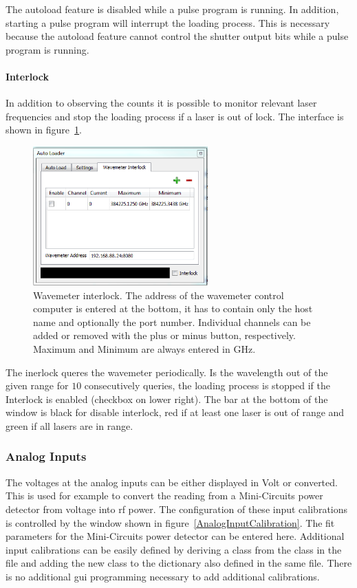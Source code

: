 \documentclass[11pt]{scrartcl}
\begin{document}
The autoload feature is disabled while a pulse program is running. In addition, starting a pulse program will interrupt the loading process. This is necessary because the autoload feature cannot control the shutter output bits while a pulse program is running.

\paragraph{Interlock}
In addition to observing the counts it is possible to monitor relevant laser frequencies and stop the loading process if a laser is out of lock. The interface is shown in figure~\ref{WavemeterInterlock}.
\begin{figure}
\centering
\includegraphics[width=0.6\textwidth]{WavemeterInterlock}
\caption{\label{WavemeterInterlock} Wavemeter interlock. The address of the wavemeter control computer is entered at the bottom, it has to contain only the host name and optionally the port number. Individual channels can be added or removed with the plus or minus button, respectively. Maximum and Minimum are always entered in GHz.}
\end{figure}

The inerlock queres the wavemeter periodically. Is the wavelength out of the given range for $10$ consecutively queries, the loading process is stopped if the Interlock is enabled (checkbox on lower right). The bar at the bottom of the window is black for disable interlock, red if at least one laser is out of range and green if all lasers are in range.

\subsubsection{Analog Inputs}
The voltages at the analog inputs can be either displayed in Volt or converted. This is used for example to convert the reading from a Mini-Circuits power detector from voltage into rf power. The configuration of these input calibrations is controlled by the window shown in figure~\ref{AnalogInputCalibration}. The fit parameters for the Mini-Circuits power detector can be entered here. Additional input calibrations can be easily defined by deriving a class from the class  in the file  and adding the new class to the dictionary  also defined in the same file. There is no additional gui programming necessary to add additional calibrations.
\end{document}
